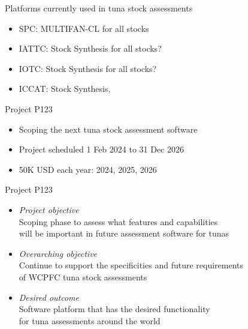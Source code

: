 \documentclass[aspectratio=169]{beamer}
\begin{document}


\begin{frame}{Platforms currently used in tuna stock assessments}\small
  \begin{itemize}
    \item[] SPC: MULTIFAN-CL for all stocks\\[5ex]
    \item[] IATTC: Stock Synthesis for all stocks?\\[5ex]
    \item[] IOTC: Stock Synthesis for all stocks?\\[3ex]
    \item[] ICCAT: Stock Synthesis, 
  \end{itemize}
\end{frame}


\begin{frame}{Project P123}\small
  \begin{itemize}
    \item[] Scoping the next tuna stock assessment software\\[5ex]
    \item[] Project scheduled 1 Feb 2024 to 31 Dec 2026\\[5ex]
    \item[] 50K USD each year: 2024, 2025, 2026\\[3ex]
  \end{itemize}
\end{frame}


\begin{frame}{Project P123}\small
  \begin{itemize}
    \item {\it Project objective}\\[0.5ex]
    Scoping phase to assess what features and capabilities\\
    will be important in future assessment software for tunas\\[4ex]

    \item {\it Overarching objective}\\[0.5ex]
    Continue to support the specificities and future requirements\\
    of WCPFC tuna stock assessments\\[4ex]

    \item {\it Desired outcome}\\[0.5ex]
    Software platform that has the desired functionality\\
    for tuna assessments around the world\\[4ex]
  \end{itemize}
\end{frame}
\end{document}
